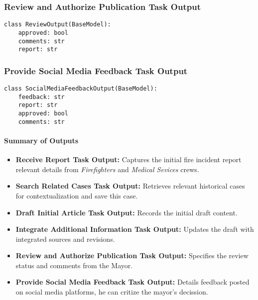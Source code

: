 \subsubsection{Review and Authorize Publication Task Output}
\begin{lstlisting}[caption={Pydantic model for Review and Authorize Publication Task Output}]
class ReviewOutput(BaseModel):
    approved: bool
    comments: str
    report: str
\end{lstlisting}

\subsubsection{Provide Social Media Feedback Task Output}
\begin{lstlisting}[caption={Pydantic model for Provide Social Media Feedback Task Output}]
class SocialMediaFeedbackOutput(BaseModel):
    feedback: str
    report: str
    approved: bool
    comments: str
\end{lstlisting}

\paragraph{Summary of Outputs}
\begin{itemize}
    \item \textbf{Receive Report Task Output:} Captures the initial fire incident report relevant details from \textit{Firefighters} and \textit{Medical Sevices} crews.
    \item \textbf{Search Related Cases Task Output:} Retrieves relevant historical cases for contextualization and save this case.
    \item \textbf{Draft Initial Article Task Output:} Records the initial draft content.
    \item \textbf{Integrate Additional Information Task Output:} Updates the draft with integrated sources and revisions.
    \item \textbf{Review and Authorize Publication Task Output:} Specifies the review status and comments from the Mayor.
    \item \textbf{Provide Social Media Feedback Task Output:} Details feedback posted on social media platforms, he can critize the mayor's decission.
\end{itemize}
